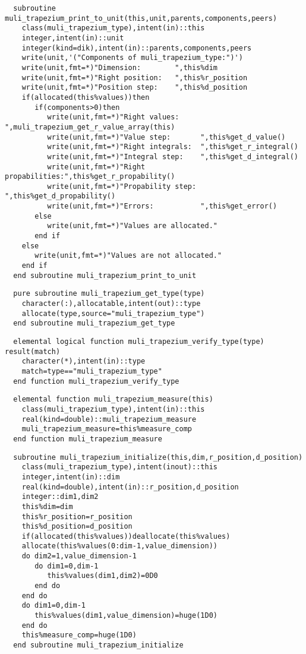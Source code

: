 \begin{Verbatim}
  subroutine muli_trapezium_print_to_unit(this,unit,parents,components,peers)
    class(muli_trapezium_type),intent(in)::this
    integer,intent(in)::unit
    integer(kind=dik),intent(in)::parents,components,peers
    write(unit,'("Components of muli_trapezium_type:")')
    write(unit,fmt=*)"Dimension:        ",this%dim
    write(unit,fmt=*)"Right position:   ",this%r_position
    write(unit,fmt=*)"Position step:    ",this%d_position
    if(allocated(this%values))then    
       if(components>0)then          
          write(unit,fmt=*)"Right values:     ",muli_trapezium_get_r_value_array(this)
          write(unit,fmt=*)"Value step:       ",this%get_d_value()
          write(unit,fmt=*)"Right integrals:  ",this%get_r_integral()
          write(unit,fmt=*)"Integral step:    ",this%get_d_integral()
          write(unit,fmt=*)"Right propabilities:",this%get_r_propability()
          write(unit,fmt=*)"Propability step: ",this%get_d_propability()
          write(unit,fmt=*)"Errors:           ",this%get_error()
       else
          write(unit,fmt=*)"Values are allocated."
       end if
    else
       write(unit,fmt=*)"Values are not allocated."
    end if
  end subroutine muli_trapezium_print_to_unit
\end{Verbatim}
\begin{Verbatim}
  pure subroutine muli_trapezium_get_type(type)
    character(:),allocatable,intent(out)::type
    allocate(type,source="muli_trapezium_type")
  end subroutine muli_trapezium_get_type
\end{Verbatim}
\begin{Verbatim}
  elemental logical function muli_trapezium_verify_type(type) result(match)
    character(*),intent(in)::type
    match=type=="muli_trapezium_type"
  end function muli_trapezium_verify_type
\end{Verbatim}
\begin{Verbatim}
  elemental function muli_trapezium_measure(this)
    class(muli_trapezium_type),intent(in)::this
    real(kind=double)::muli_trapezium_measure
    muli_trapezium_measure=this%measure_comp
  end function muli_trapezium_measure
\end{Verbatim}
\begin{Verbatim}
  subroutine muli_trapezium_initialize(this,dim,r_position,d_position)
    class(muli_trapezium_type),intent(inout)::this
    integer,intent(in)::dim
    real(kind=double),intent(in)::r_position,d_position
    integer::dim1,dim2
    this%dim=dim
    this%r_position=r_position
    this%d_position=d_position
    if(allocated(this%values))deallocate(this%values)
    allocate(this%values(0:dim-1,value_dimension))
    do dim2=1,value_dimension-1
       do dim1=0,dim-1
          this%values(dim1,dim2)=0D0
       end do       
    end do
    do dim1=0,dim-1
       this%values(dim1,value_dimension)=huge(1D0)
    end do
    this%measure_comp=huge(1D0)
  end subroutine muli_trapezium_initialize
\end{Verbatim}

